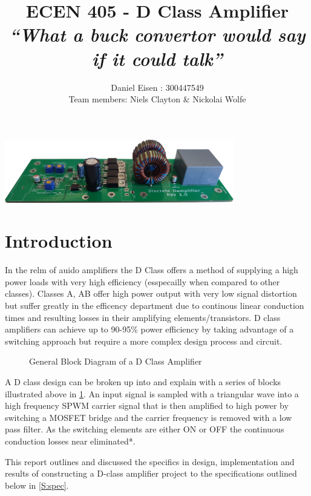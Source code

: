 \documentclass[11pt]{article}
\title{ECEN 405 -  D Class Amplifier \\ \large{\textit{``What a buck convertor would say if it could talk''}} }
\author{Daniel Eisen : 300447549 \\Team members: Niels Clayton \& Nickolai Wolfe}
\date{}
\begin{document}
\maketitle
\begin{center}
  \vspace*{-8mm}
  \includegraphics[width=0.75\textwidth]{img/real.png}
\end{center}{

\section{Introduction}

In the relm of auido amplifiers the D Class offers a method of supplying a high power loads with very high efficiency (esspecailly when compared to other classes). Classes A, AB offer high power output with very low signal distortion but suffer greatly in the efficency department due to continous linear conduction times and resulting losses in their amplifying elements/transistors. D class amplifiers can achieve up to 90-95\% power efficiency by taking advantage of a switching approach but require a more complex design process and circuit.

\begin{figure}[h!]
  \centering
  \caption{General Block Diagram of a D Class Amplifier}
  \label{F:block}
\end{figure}
A D class design can be broken up into and explain with a series of blocks illustrated above in \cref{F:block}. An input signal is sampled with a triangular wave into a high frequency SPWM carrier signal that is then amplified to high power by switching a MOSFET bridge and the carrier frequency is removed with a low pass filter. As the switching elements are either ON or OFF the continuous conduction losses near eliminated*.

This report outlines and discussed the specifics in design, implementation and results of constructing a D-class amplifier project to the specifications outlined below in \cref{S:spec}.

}
\end{document}
